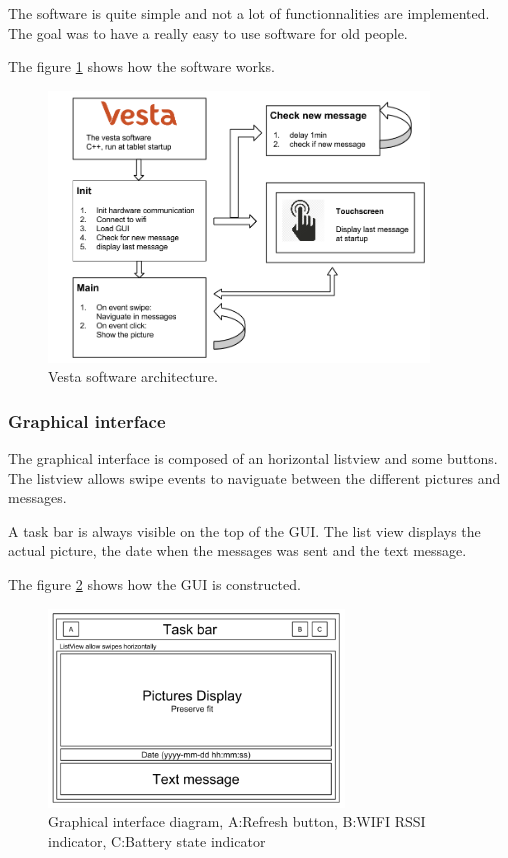 The software is quite simple and not a lot of functionnalities are implemented. The goal was to have a really easy to use software for old people.

The figure \ref{fig:soft archi} shows how the software works.

\begin{figure}[!htb]
    \centering
    \includegraphics[width=0.9\textwidth,keepaspectratio]{chap/softFig/vesta_software_diagram2}
    \caption{Vesta software architecture.}
    \label{fig:soft archi}
\end{figure}

\clearpage

\subsubsection{Graphical interface}
The graphical interface is composed of an horizontal listview and some buttons. The listview allows swipe events to naviguate between the different pictures and messages.

A task bar is always visible on the top of the GUI. The list view displays the actual picture, the date when the messages was sent and the text message.

The figure \ref{fig:gui diagram} shows how the GUI is constructed.

\begin{figure}[!htb]
    \centering
    \includegraphics[width=0.7\textwidth,keepaspectratio]{chap/softFig/GUI_diagram}
    \caption{Graphical interface diagram, A:Refresh button, B:WIFI RSSI indicator, C:Battery state indicator}
    \label{fig:gui diagram}
\end{figure}

